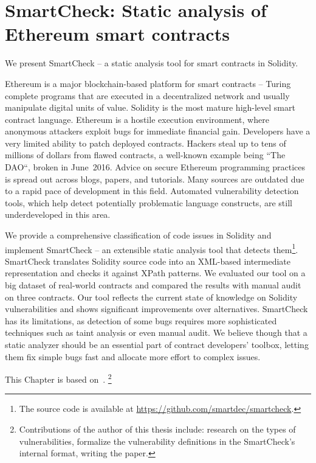 \chapter{SmartCheck: Static analysis of Ethereum smart contracts}

\label{Chapter11SmartCheck}



We present SmartCheck -- a static analysis tool for smart contracts in Solidity.

Ethereum is a major blockchain-based platform for smart contracts -- Turing complete programs that are executed in a decentralized network and usually manipulate digital units of value.
Solidity is the most mature high-level smart contract language.
Ethereum is a hostile execution environment, where anonymous attackers exploit bugs for immediate financial gain.
Developers have a very limited ability to patch deployed contracts.
Hackers steal up to tens of millions of dollars from flawed contracts, a well-known example being ``The DAO``, broken in June~2016.
Advice on secure Ethereum programming practices is spread out across blogs, 
papers, and tutorials.
Many sources are outdated due to a rapid pace of development in this field.
Automated vulnerability detection tools, which help detect potentially problematic language constructs, are still underdeveloped in this area.

We provide a comprehensive classification of code issues in Solidity and implement SmartCheck -- an extensible static analysis tool that detects them\footnote{The source code is available at \url{https://github.com/smartdec/smartcheck}.}.
SmartCheck translates Solidity source code into an XML-based intermediate representation and checks it against XPath patterns.
We evaluated our tool on a big dataset of real-world contracts and compared the results with manual audit on three contracts.
Our tool reflects the current state of knowledge on Solidity vulnerabilities and shows significant improvements over alternatives.
SmartCheck has its limitations, as detection of some bugs requires more sophisticated techniques such as taint analysis or even manual audit.
We believe though that a static analyzer should be an essential part of contract developers' toolbox, letting them fix simple bugs fast and allocate more effort to complex issues.

This Chapter is based on~\cite{Tikhomirov2018}.
\footnote{Contributions of the author of this thesis include: research on the types of vulnerabilities, formalize the vulnerability definitions in the SmartCheck's internal format, writing the paper.}


